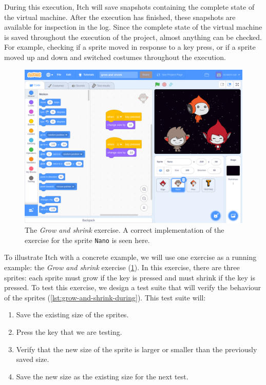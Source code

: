 \documentclass[../main]{subfiles}
\begin{document}
During this execution, Itch will save snapshots containing the complete state of the virtual machine.
After the execution has finished, these snapshots are available for inspection in the log.
Since the complete state of the virtual machine is saved throughout the execution of the project, almost anything can be checked.
For example, checking if a sprite moved in response to a key press, or if a sprite moved up and down and switched costumes throughout the execution.


\begin{figure}
    \begin{wide}
        \includegraphics[width=\linewidth]{itch-grow-and-shrink-code}
    \end{wide}
    \caption{
        The \emph{Grow and shrink} exercise.
        A correct implementation of the exercise for the sprite \texttt{Nano} is seen here.
    }
    \label{fig:itch-grow-shrink-code}
\end{figure}

To illustrate Itch with a concrete example, we will use one exercise as a running example: the \emph{Grow and shrink} exercise (\cref{fig:itch-grow-shrink-code}).
In this exercise, there are three sprites: each sprite must grow if the  key is pressed and must shrink if the  key is pressed.
To test this exercise, we design a test suite that will verify the behaviour of the sprites (\cref{lst:grow-and-shrink-during}).
This test suite will:

\begin{enumerate}[noitemsep]
    \item Save the existing size of the sprites.
    \item Press the key that we are testing.
    \item Verify that the new size of the sprite is larger or smaller than the previously saved size.
    \item Save the new size as the existing size for the next test.
\end{enumerate}
\end{document}
